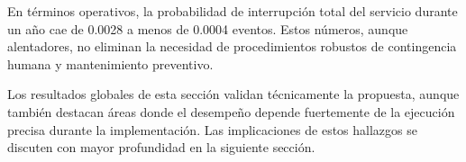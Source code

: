 En términos operativos, la probabilidad de interrupción total del servicio durante un año cae de 0.0028 a menos de 0.0004 eventos. Estos números, aunque alentadores, no eliminan la necesidad de procedimientos robustos de contingencia humana y mantenimiento preventivo. 

Los resultados globales de esta sección validan técnicamente la propuesta, aunque también destacan áreas donde el desempeño depende fuertemente de la ejecución precisa durante la implementación. Las implicaciones de estos hallazgos se discuten con mayor profundidad en la siguiente sección.